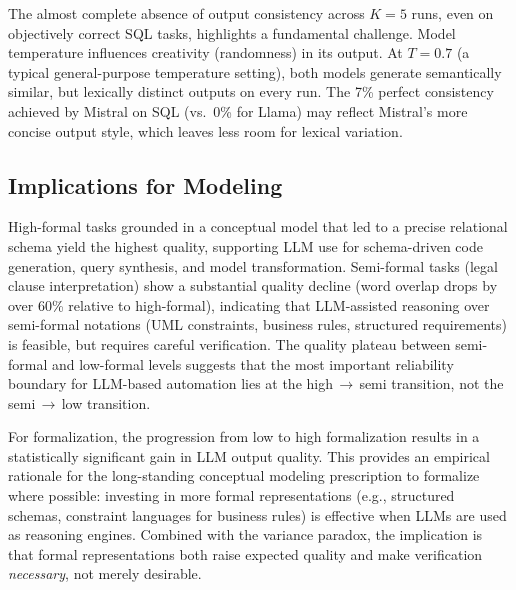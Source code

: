 \documentclass[runningheads]{llncs}
\begin{document}

The almost complete absence of output consistency across $K\!=\!5$ runs, even on objectively correct SQL tasks, highlights a fundamental challenge. Model temperature influences creativity (randomness) in its output. At $T\!=\!0.7$ (a typical general-purpose temperature setting), both models generate semantically similar, but lexically distinct outputs on every run. The 7\% perfect consistency achieved by Mistral on SQL (vs.\ 0\% for Llama) may reflect Mistral's more concise output style, which leaves less room for lexical variation.



\subsection{Implications for Modeling}

High-formal tasks grounded in a conceptual model that led to a precise relational schema yield the highest quality, supporting LLM use for schema-driven code generation, query synthesis, and model transformation.
Semi-formal tasks (legal clause interpretation) show a substantial quality decline (word overlap drops by over 60\% relative to high-formal), indicating that LLM-assisted reasoning over semi-formal notations (UML constraints, business rules, structured requirements) is feasible, but requires careful verification. The quality plateau between semi-formal and low-formal levels suggests that
the most important reliability boundary for LLM-based automation lies at the high$\,\to\,$semi transition, not the semi$\,\to\,$low transition.

For formalization, the progression from low to high formalization results in a statistically significant gain in LLM output quality. This provides an empirical rationale for the long-standing conceptual modeling prescription to formalize where possible: investing in more formal representations (e.g., structured schemas, constraint languages for business rules) is effective when LLMs are used as reasoning engines. Combined with the variance paradox, the implication is that formal representations both raise expected quality and make verification \emph{necessary}, not merely desirable.
\end{document}

